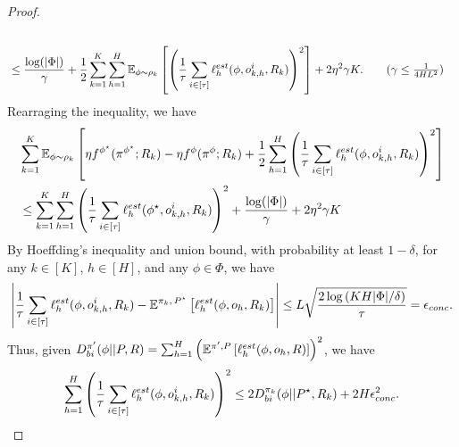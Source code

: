 \begin{proof}
\begin{align}
    \\&\le \frac{\log(|\Phi|)}{\gamma} + \frac{1}{2} \sum_{k=1}^K \sum_{h=1}^H  \E_{\phi \sim \rho_k}\left[\left(\frac{1}{\tau} \sum_{i \in [\tau]}\ellest_h(\phi, o_{k,h}^i, R_k)\right)^2\right] + 2\eta^2 \gamma K.  \tag{$\gamma \le \frac{1}{4HL^2}$} \nonumber
\end{align}
Rearraging the inequality, we have
\begin{align}
&\sum_{k=1}^K \mathbb{E}_{\phi \sim \rho_k}\left[\eta f^{\phi^\star}(\pi^{\phi^\star}; R_k) - \eta f^{\phi}(\pi^{\phi}; R_k) + \frac{1}{2}\sum_{h=1}^H \left(\frac{1}{\tau} \sum_{i \in [\tau]}\ell^{est}_h(\phi, o_{k,h}^i, R_k)\right)^2\right] \nonumber
\\&\le  \sum_{k=1}^K \sum_{h=1}^H \left(\frac{1}{\tau} \sum_{i \in [\tau]}\ell^{est}_h(\phi^\star, o_{k,h}^i, R_k)\right)^2 +  \frac{\log(|\Phi|)}{\gamma} + 2\eta^2 \gamma K 
\label{eq:opt-exp-start}
\end{align}
By Hoeffding's inequality and union bound, with probability at least $1-\delta$, for any $k\in[K]$, $h\in[H]$, and any $\phi \in \Phi$, we have
\begin{align*}
    \left|\frac{1}{\tau} \sum_{i \in [\tau]}\ell^{est}_h(\phi, o_{k,h}^i, R_k) -  \mathbb{E}^{ \pi_k,\, P^\star}\left[\ell^{est}_h(\phi, o_h, R_k)\right]\right| \le L\sqrt{\frac{2\log\left(KH|\Phi|/\delta\right)}{\tau}} = \epsilon_{conc}. 
\end{align*}
Thus, given $D_{bi}^{\pi'}(\phi||P, R) = \sum_{h=1}^H  \left(\mathbb{E}^{\pi', P}\left[\ell^{est}_h(\phi, o_h, R)\right]\right)^2$, we have 
\begin{align}
     \sum_{h=1}^H  \left(\frac{1}{\tau} \sum_{i \in [\tau]}\ell^{est}_h(\phi, o_{k,h}^i, R_k)\right)^2 \le 2 D_{bi}^{\pi_k}(\phi||P^\star, R_k) + 2H\epsilon_{conc}^2.
     \label{eq:conc1}
\end{align}


\end{proof}
